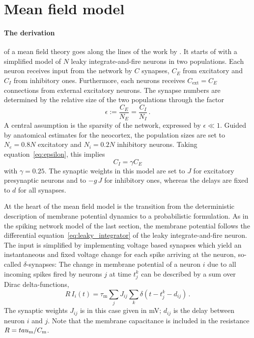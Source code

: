\FloatBarrier
\section{Mean field model}
\paragraph{The derivation} of a mean field theory goes along the 
lines of the work by .
It starts of with a simplified model of 
$N$ leaky integrate-and-fire neurons in two populations. 
Each neuron receives input from the network by $C$ synapses, 
$C_E$ from excitatory and $C_I$ from inhibitory ones. 
Furthermore, each neurons receives $C_\text{ext} = C_E$ connections from 
external excitatory neurons.
The synapse numbers 
are determined by the relative size of the two populations through the factor
\begin{equation}
    \epsilon := \frac{C_E}{N_E} = \frac{C_I}{N_I} \,.
    \label{eq:epsilon}
\end{equation}
A central assumption is the sparsity of the network, expressed by $\epsilon \ll 1$.
Guided by anatomical estimates for the neocortex, the population sizes are set to
$N_e = 0.8N$ excitatory and $N_i = 0.2N$ inhibitory neurons. Taking equation~\eqref{eq:epsilon}, 
this implies 
\begin{equation}
    C_I = \gamma C_E 	
 \label{eq:C_I}
\end{equation}
with $\gamma = 0.25$. The synaptic weights in this model are set to $J$ for 
excitatory presynaptic neurons and to $-g\, J$ for inhibitory ones, 
whereas the delays are fixed to $d$ for all synapses. 

At the heart of the mean field model
is the transition from the deterministic description of membrane potential 
dynamics to a probabilistic formulation. 
As in the spiking network model of the last section, the membrane potential follows
the differential equation~\eqref{eq:leaky_integrator}
of the leaky integrate-and-fire neuron. The input is simplified 
by implementing voltage based synapses which
yield an instantaneous and fixed voltage change
for each spike arriving at the neuron, so-called $\delta$-synapses:
The change in membrane potential of a neuron $i$ due to all incoming spikes 
fired by neurons $j$ at time $t_j^k$ 
can be described by a sum over Dirac delta-functions, 
\begin{equation}
    R\,I_i(t) = \tau_\text{m} \sum_j J_{ij} \sum_k \delta(t - t_j^k - d_{ij}) \,.
    \label{eq:input_const_volt}
\end{equation}
The synaptic weights $J_{ij}$ is in this case given in mV; $d_{ij}$ is the delay 
between neuron $i$ and $j$. Note that the membrane capacitance is included in the 
resistance $R = \\tau_\text{m} / C_\text{m}$.

